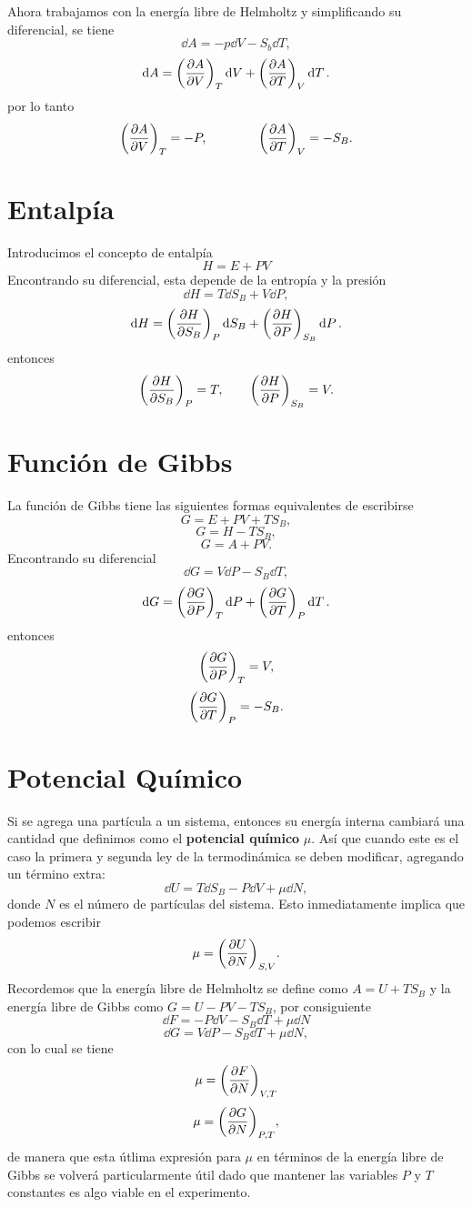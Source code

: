 Ahora trabajamos con la energía libre de Helmholtz y simplificando su diferencial, se tiene
	$$ \dd{A} = -p\dd{V} - S_b \dd{T}, $$
	$$ \dd{A} = \qty(\pdv{A}{V})_T \dd{V} + \qty(\pdv{A}{T})_V \dd{T}. $$
por lo tanto
	$$ \qty(\pdv{A}{V})_T = -P,\qquad \qquad \qty(\pdv{A}{T})_V = -S_B. $$
	
\section{Entalpía}
Introducimos el concepto de entalpía
	$$ H = E + PV $$
Encontrando su diferencial, esta depende de la entropía y la presión
	$$ \dd{H} = T\dd{S_B} + V\dd{P}, $$
	$$ \dd{H} = \qty(\pdv{H}{S_B})_P \dd{S_B} + \qty(\pdv{H}{P})_{S_B} \dd{P}. $$
entonces
	$$ \qty(\pdv{H}{S_B})_P = T, \qquad \qty(\pdv{H}{P})_{S_B} = V. $$


\section{Función de Gibbs}
La función de Gibbs tiene las siguientes formas equivalentes de escribirse
	$$ G = E + PV + TS_B, $$
	$$ G = H - TS_B, $$
	$$ G = A + PV. $$
Encontrando su diferencial
	$$ \dd{G} = V\dd{P} - S_B \dd{T}, $$
	$$ \dd{G} = \qty(\pdv{G}{P})_T \dd{P} + \qty(\pdv{G}{T})_P \dd{T}. $$
entonces
	$$ \qty(\pdv{G}{P})_T = V, $$
	$$ \qty(\pdv{G}{T})_P = -S_B . $$


\section{Potencial Químico}
Si se agrega una partícula a un sistema, entonces su energía interna cambiará una cantidad que definimos como el \textbf{potencial químico} $\mu$. Así que cuando este es el caso la primera y segunda ley de la termodinámica se deben modificar, agregando un término extra: 
	$$ \dd{U} = T\dd{S_B} - P\dd{V} + \mu \dd{N}, $$
donde $N$ es el número de partículas del sistema. Esto inmediatamente implica que podemos escribir
	$$ \mu = \qty(\pdv{U}{N})_{S,V} . $$
Recordemos que la energía libre de Helmholtz se define como $A = U + TS_B$ y la energía libre de Gibbs como $G = U - PV - TS_B$, por consiguiente
	$$ \dd{F} = -P\dd{V} - S_B \dd{T} + \mu \dd{N} $$
	$$ \dd{G} = V\dd{P} - S_B \dd{T} + \mu\dd{N}, $$
con lo cual se tiene
	$$ \mu = \qty(\pdv{F}{N})_{V,T} $$
	$$ \mu = \qty(\pdv{G}{N})_{P,T}, $$
de manera que esta útlima expresión para $\mu$ en términos de la energía libre de Gibbs se volverá particularmente útil dado que mantener las variables $P$ y $T$ constantes es algo viable en el experimento.\\


